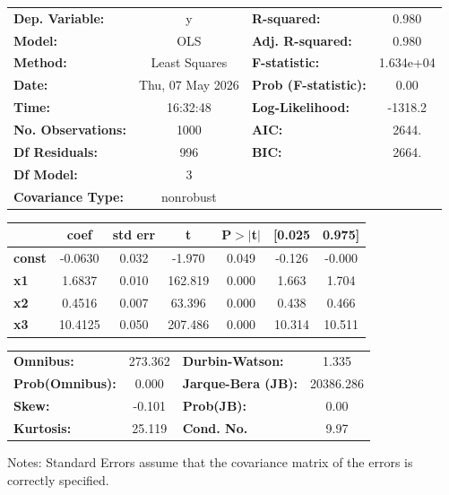 \begin{center}
\begin{tabular}{lclc}
\toprule
\textbf{Dep. Variable:}    &        y         & \textbf{  R-squared:         } &     0.980   \\
\textbf{Model:}            &       OLS        & \textbf{  Adj. R-squared:    } &     0.980   \\
\textbf{Method:}           &  Least Squares   & \textbf{  F-statistic:       } & 1.634e+04   \\
\textbf{Date:}             & Thu, 07 May 2026 & \textbf{  Prob (F-statistic):} &     0.00    \\
\textbf{Time:}             &     16:32:48     & \textbf{  Log-Likelihood:    } &   -1318.2   \\
\textbf{No. Observations:} &        1000      & \textbf{  AIC:               } &     2644.   \\
\textbf{Df Residuals:}     &         996      & \textbf{  BIC:               } &     2664.   \\
\textbf{Df Model:}         &           3      & \textbf{                     } &             \\
\textbf{Covariance Type:}  &    nonrobust     & \textbf{                     } &             \\
\bottomrule
\end{tabular}
\begin{tabular}{lcccccc}
               & \textbf{coef} & \textbf{std err} & \textbf{t} & \textbf{P$> |$t$|$} & \textbf{[0.025} & \textbf{0.975]}  \\
\midrule
\textbf{const} &      -0.0630  &        0.032     &    -1.970  &         0.049        &       -0.126    &       -0.000     \\
\textbf{x1}    &       1.6837  &        0.010     &   162.819  &         0.000        &        1.663    &        1.704     \\
\textbf{x2}    &       0.4516  &        0.007     &    63.396  &         0.000        &        0.438    &        0.466     \\
\textbf{x3}    &      10.4125  &        0.050     &   207.486  &         0.000        &       10.314    &       10.511     \\
\bottomrule
\end{tabular}
\begin{tabular}{lclc}
\textbf{Omnibus:}       & 273.362 & \textbf{  Durbin-Watson:     } &     1.335  \\
\textbf{Prob(Omnibus):} &   0.000 & \textbf{  Jarque-Bera (JB):  } & 20386.286  \\
\textbf{Skew:}          &  -0.101 & \textbf{  Prob(JB):          } &      0.00  \\
\textbf{Kurtosis:}      &  25.119 & \textbf{  Cond. No.          } &      9.97  \\
\bottomrule
\end{tabular}
\end{center}

Notes: \newline
 [1] Standard Errors assume that the covariance matrix of the errors is correctly specified.
